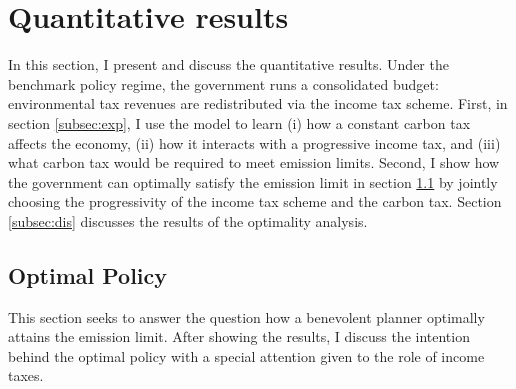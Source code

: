 \section{Quantitative results}\label{sec:res}

In this section, I present and discuss the quantitative results. Under the benchmark policy regime, the government runs a consolidated budget: environmental tax revenues are redistributed via the income tax scheme. 
First, in section \ref{subsec:exp}, I use the model to learn (i) how a constant carbon tax affects the economy, (ii) how it interacts with a progressive income tax, and (iii) what carbon tax would be required to meet emission limits.
Second, I show how the government can optimally satisfy the emission limit in section \ref{subsec:mr} by jointly choosing the progressivity of the income tax scheme and the carbon tax. Section \ref{subsec:dis} discusses the results of the optimality analysis. 




\subsection{Optimal Policy}\label{subsec:mr}
This section seeks to answer the question how a benevolent planner optimally attains the emission limit. After showing the results, I discuss the intention behind the optimal policy with a special attention given to the role of income taxes. 

